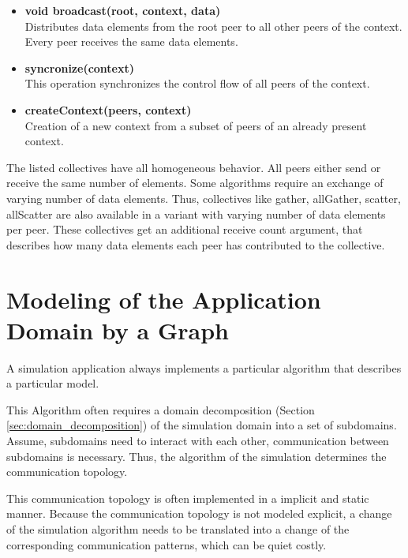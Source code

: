 \begin{itemize}
\item  \textbf{void broadcast(root, context, data)}\\
  Distributes data elements from the root peer to all other peers of
  the context. Every peer receives the same data elements.

\item  \textbf{syncronize(context)}\\
  This operation synchronizes the control flow of all peers of the
  context.

\item  \textbf{createContext(peers, context)}\\ 
  Creation of a new context from a subset of peers of an already
  present context.

\end{itemize}

The listed collectives have all homogeneous behavior. All peers either
send or receive the same number of elements.  Some algorithms require
an exchange of varying number of data elements. Thus, collectives like
gather, allGather, scatter, allScatter are also available in a variant
with varying number of data elements per peer. These collectives get
an additional receive count argument, that describes how many data
elements each peer has contributed to the collective.


\section{Modeling of the Application Domain by a Graph}
\label{sec:graph}
A simulation application always implements a particular algorithm
that describes a particular model.

This Algorithm often requires a
domain decomposition (Section \ref{sec:domain_decomposition}) of the
simulation domain into a set of subdomains. Assume, subdomains need
to interact with each other, communication between subdomains is
necessary. Thus, the algorithm of the simulation determines
the communication topology.



This communication topology is often implemented in a implicit and
static manner.  Because the communication topology is not modeled
explicit, a change of the simulation algorithm needs to be translated
into a change of the corresponding communication patterns, which can
be quiet costly.


